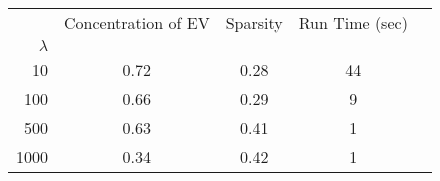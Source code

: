 \begin{tabular}{r|cccc}
\toprule
{} &  Concentration of EV &  Sparsity & Run Time (sec) \\
$\lambda$ &                      &           &                \\
\midrule
10        &                 0.72 &      0.28 &             44 \\
100       &                 0.66 &      0.29 &              9 \\
500       &                 0.63 &      0.41 &              1 \\
1000      &                 0.34 &      0.42 &              1 \\
\bottomrule
\end{tabular}
